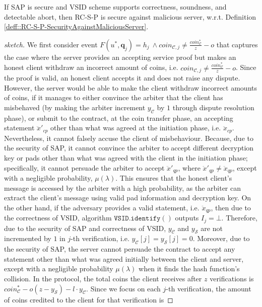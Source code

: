 
 \begin{lemma}
 If SAP is secure and  VSID scheme supports correctness, soundness, and detectable abort, then RC-S-P is secure against malicious server, w.r.t. Definition \ref{deff::RC-S-P-SecurityAgainstMaliciousServer}. 
 \end{lemma}
 

 \begin{proof}[sketch]
We first consider event $F(u^{\scriptscriptstyle *},\bm{q}_{\scriptscriptstyle j})= h_{\scriptscriptstyle j}\ \wedge coin_{\scriptscriptstyle\mathcal{C},j}\neq  \frac{coin_{\scriptscriptstyle\mathcal C}^{\scriptscriptstyle*}}{z}-o$ that captures the case where the server provides an accepting service proof but makes an honest client withdraw an incorrect amount of coins, i.e. $coin_{\scriptscriptstyle\mathcal{C},j}\neq  \frac{coin_{\scriptscriptstyle\mathcal C}^{\scriptscriptstyle*}}{z}-o$. Since the proof is valid, an honest client accepts it and does not raise any dispute. 
  However, the server  would be able to make the client  withdraw incorrect amounts of coins, if it manages to either convince the arbiter that the client has misbehaved (by making the arbiter increment $y_{\scriptscriptstyle\mathcal {C}}$  by $1$ through dispute resolution phase), or submit to the contract, at the coin transfer phase,  an accepting  statement $\ddot{x}'_{\scriptscriptstyle cp}$ other than what was agreed at the initiation phase, i.e. $\ddot{x}_{\scriptscriptstyle cp}$. Nevertheless, it cannot falsely accuse the client of misbehaviour. Because,  due to the security of SAP, it cannot  convince the arbiter to accept different decryption key or pads other than what was agreed with the client in the initiation phase; specifically, it cannot persuade the arbiter to accept  $\ddot{x}'_{\scriptscriptstyle qp}$, where $\ddot{x}'_{\scriptscriptstyle qp}\neq \ddot{x}_{\scriptscriptstyle qp}$, except with a negligible probability, $\mu(\lambda)$. This ensures that the honest client's message is accessed by  the arbiter with a high probability, as the arbiter can extract the client's message using valid pad information and decryption key.  On the other hand, if the adversary provides a valid statement, i.e. $\ddot{x}_{\scriptscriptstyle qp}$, then due to the correctness of VSID, algorithm $\mathtt{VSID.identify}()$ outputs $I_{\scriptscriptstyle j}=\bot$. Therefore, due to the security of SAP and correctness of VSID,   $y_{\scriptscriptstyle\mathcal {C}}$ and $y_{\scriptscriptstyle\mathcal {S}}$ are not incremented by $1$  in $j$-th verification, i.e. $y_{\scriptscriptstyle\mathcal{C}}[j]=y_{\scriptscriptstyle\mathcal{S}}[j]=0$.  Moreover,  due to the security of SAP, the server cannot persuade the contract to accept any statement other than what was agreed initially between the client and server, except with a negligible probability $\mu(\lambda)$ when it finds the hash function's collision. In the protocol, the total coins the client receives after $z$ verifications is $coin^{\scriptscriptstyle *}_{\scriptscriptstyle\mathcal C}-o(z-y_{\scriptscriptstyle\mathcal S})-l\cdot y_{\scriptscriptstyle\mathcal C}$. Since we focus on each $j$-th verification, the amount of  coins credited to the client for that verification is
  

\end{proof}
